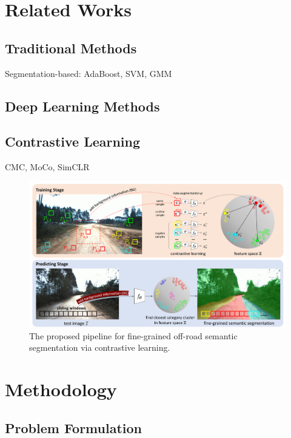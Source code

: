 \documentclass[letterpaper, 10 pt, conference]{ieeeconf}  %
\begin{document}
\section{Related Works} \label{related_works}
\subsection{Traditional Methods}
Segmentation-based: AdaBoost, SVM, GMM

\subsection{Deep Learning Methods}

\subsection{Contrastive Learning}
CMC, MoCo, SimCLR

\begin{figure}[]
	\centering
	\includegraphics[scale=0.24]{pipeline.pdf}
	\caption{The proposed pipeline for fine-grained off-road semantic segmentation via contrastive learning.}
	\label{fig:pipeline}
\end{figure}


\section{Methodology} \label{methodology}

\subsection{Problem Formulation}
\end{document}
